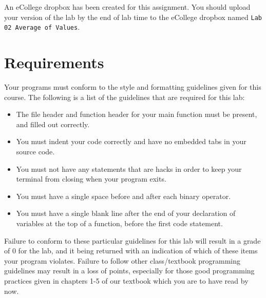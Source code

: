 \documentclass[11pt]{article}
\begin{document}
An eCollege dropbox has been created for this assignment.  You should upload your version of the lab by the
end of lab time to the eCollege dropbox named \verb~Lab 02 Average of Values~.
\section*{Requirements}
\label{sec-5}

Your programs must conform to the style and formatting guidelines given for this course.
The following is a list of the guidelines that are required for this lab:

\begin{itemize}
\item The file header and function header for your main function must be present, and filled out correctly.
\item You must indent your code correctly and have no embedded tabs in your source code.
\item You must not have any statements that are hacks in order to keep your terminal from closing when your program exits.
\item You must have a single space before and after each binary operator.
\item You must have a single blank line after the end of your declaration
  of variables at the top of a function, before the first code
  statement.
\end{itemize}

Failure to conform to these particular guidelines for this lab will
result in a grade of 0 for the lab, and it being returned with an
indication of which of these items your program violates.  Failure to
follow other class/textbook programming guidelines may result in a
loss of points, especially for those good programming practices given
in chapters 1-5 of our textbook which you are to have read by now.
\end{document}
